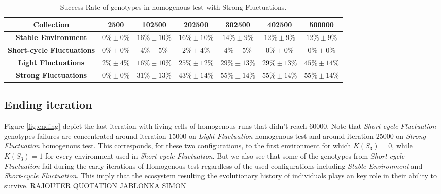\begin{table}
\caption{Success Rate of genotypes in homogenous test with Strong Fluctuations.\label{tab:scstrong}}
\scriptsize
\begin{tabular}{ccccccc}
\toprule%
{\textbf{Collection}} & {\textbf{2500}} & \textbf{102500} & \textbf{202500} &\textbf{302500} &\textbf{402500} &\textbf{500000} \tabularnewline
\toprule%

\textbf{Stable Environment} & $0\%\pm0\%$ & $16\%\pm10\%$ & $16\%\pm10\%$ & $14\%\pm9\%$ & $12\%\pm9\%$ & $12\%\pm9\%$\tabularnewline
\textbf{Short-cycle Fluctuations} & $0\%\pm0\%$ & $4\%\pm5\%$ & $2\%\pm4\%$ & $4\%\pm5\%$ & $0\%\pm0\%$ & $0\%\pm0\%$\tabularnewline
\textbf{Light Fluctuations} & $2\%\pm4\%$ & $16\%\pm10\%$ & $25\%\pm12\%$ & $29\%\pm13\%$ & $29\%\pm13\%$ & $45\%\pm14\%$\tabularnewline
\textbf{Strong Fluctuations} & $0\%\pm0\%$ & $31\%\pm13\%$ & $43\%\pm14\%$ & $55\%\pm14\%$ & $55\%\pm14\%$ & $55\%\pm14\%$\tabularnewline

\bottomrule%
\end{tabular}%
\end{table} 

\subsection{Ending iteration}

Figure \ref{fig:ending} depict the last iteration with living cells of homogenous runs that didn't reach 60000. Note that \emph{Short-cycle Fluctuation} genotypes failures are concentrated around iteration 15000 on \emph{Light Fluctuation} homogenous test and around iteration 25000 on \emph{Strong Fluctuation} homogenous test. This corresponds, for these two configurations, to the first environment for which $K(S_3)=0$, while $K(S_3)=1$ for every environment used in \emph{Short-cycle Fluctuation}. But we also see that some of the genotypes from \emph{Short-cycle Fluctuation} fail during the early iterations of Homogenous test regardless of the used configurations including \emph{Stable Environment} and \emph{Short-cycle Fluctuation}. This imply that the ecosystem resulting the evolutionary history of individuals plays an key role in their ability to survive. RAJOUTER QUOTATION JABLONKA SIMON

